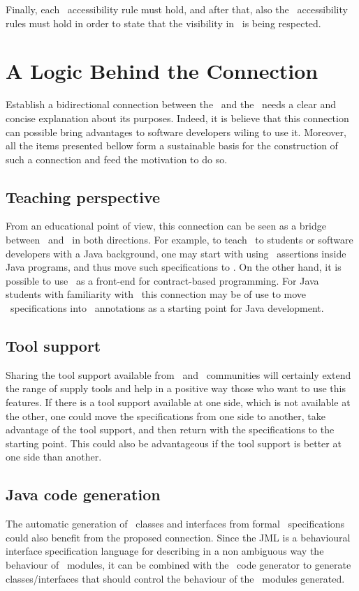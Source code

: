 Finally, each \jml\ accessibility rule must hold, and after that, also the \java\ accessibility rules must hold in order to state that the visibility in \jml\ is being respected.


\section{A Logic Behind the Connection}

Establish a bidirectional connection between the \vpp\ and the \jml\ needs a clear and concise explanation about its purposes.
Indeed, it is believe that this connection can possible bring advantages to software developers wiling to use it.
Moreover, all the items presented bellow form a sustainable basis for the construction of such 
a connection and feed the motivation to do so.

\subsection{Teaching perspective}
From an educational point of view,  this connection can be seen as a bridge between \vpp\ and \jml\ in both directions. For example, to teach \vpp\ to students or software developers with a Java background, one may start with  using \jml\ assertions inside Java programs, and thus move such  specifications to \vpp. 
On the other hand, it is possible to use \vpp\ as a front-end for contract-based programming. For Java students with familiarity with \vpp\  this connection may be of use to move \vpp\ specifications into \jml\ annotations as a starting point for Java development.

\subsection{Tool support}
Sharing the tool support available from \vpp\ and \jml\ communities will certainly extend the range of supply tools 
and help in a positive way those who want to use this features. If there is a tool support available at one side, which is not available at the other, one could move the specifications from one side to another, take advantage of the tool support, and then return with the specifications to the starting point. This could also be advantageous if the tool support is better at one side than another.

\subsection{Java code generation}
The automatic generation of \java\ classes and interfaces from formal \vpp\ specifications could also benefit from the proposed connection.
Since the JML is a behavioural interface specification language for describing in a non ambiguous way the behaviour of 
\java\ modules, it can be combined with the \java\ code generator to generate classes/interfaces that should control the 
behaviour of the \java\ modules generated.


